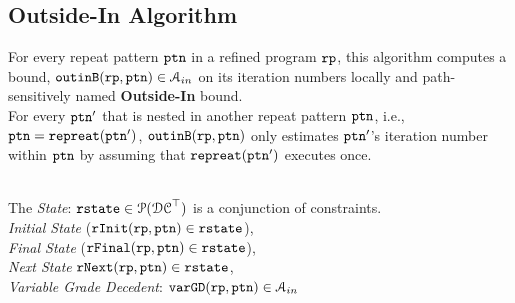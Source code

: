 \subsection{Outside-In Algorithm
}
\label{sec:pathsensitive_rb-outinalg}
%
For every repeat pattern $\mathtt{ptn}$ in a refined program $\mathtt{rp}$, 
this algorithm
computes a bound, $\mathtt{outinB}(\mathtt{rp}, \mathtt{ptn}) \in \mathcal{A}_{in}$ on its iteration numbers locally and path-sensitively
named \textbf{Outside-In} bound.
\\
For every $\mathtt{ptn}'$ that is nested
in another repeat pattern $\mathtt{ptn}$, i.e., $\mathtt{ptn} = \mathtt{repreat}(\mathtt{ptn}')$,
$\mathtt{outinB}(\mathtt{rp}, \mathtt{ptn})$ only estimates
$\mathtt{ptn}'$'s iteration number within $\mathtt{ptn}$ by assuming that $\mathtt{repreat}(\mathtt{ptn}')$ executes once.

\\
The \emph{State}: 
$\mathtt{rstate} \in \mathcal{P}(\mathcal{DC}^{\top})$ is a conjunction of constraints.
\\
\emph{Initial State} ($\mathtt{rInit}(\mathtt{rp}, \mathtt{ptn}) \in \mathtt{rstate}$), 
\\
\emph{Final State} ($\mathtt{rFinal}(\mathtt{rp}, \mathtt{ptn}) \in \mathtt{rstate}$),
\\
\emph{Next State} $\mathtt{rNext}(\mathtt{rp}, \mathtt{ptn}) \in \mathtt{rstate}$,
\\
\emph{Variable Grade Decedent}: $\mathtt{varGD}(\mathtt{rp}, \mathtt{ptn}) \in \mathcal{A}_{in}$

